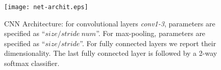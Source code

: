 \begin{figure}
\texttt{[image: net-archit.eps]}
\caption{CNN Architecture: for convolutional layers \emph{conv1-3}, parameters are specified as ``$size/stride~num$''.
For max-pooling, parameters are specified as ``$size/stride$''.
For fully connected layers we report their dimensionality.
The last fully connected layer is followed by a 2-way softmax classifier.}
\label{fig:mini:cnns}
\end{figure}



